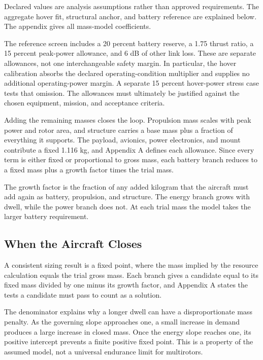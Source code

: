 \documentclass[twocolumn,letterpaper]{IEEEAerospaceCLS}
\begin{document}
Declared values are analysis assumptions rather than approved requirements. The aggregate hover fit, structural anchor, and battery reference are explained below. The appendix gives all mass-model coefficients.

The reference screen includes a 20 percent battery reserve, a 1.75 thrust ratio, a 15 percent peak-power allowance, and 6 dB of other link loss. These are separate allowances, not one interchangeable safety margin. In particular, the hover calibration absorbs the declared operating-condition multiplier and supplies no additional operating-power margin. A separate 15 percent hover-power stress case tests that omission. The allowances must ultimately be justified against the chosen equipment, mission, and acceptance criteria.

Adding the remaining masses closes the loop. Propulsion mass scales with peak power and rotor area, and structure carries a base mass plus a fraction of everything it supports. The payload, avionics, power electronics, and mount contribute a fixed 1.116 kg, and Appendix A defines each allowance. Since every term is either fixed or proportional to gross mass, each battery branch reduces to a fixed mass plus a growth factor times the trial mass.

The growth factor is the fraction of any added kilogram that the aircraft must add again as battery, propulsion, and structure. The energy branch grows with dwell, while the power branch does not. At each trial mass the model takes the larger battery requirement.

\subsection{When the Aircraft Closes}

A consistent sizing result is a fixed point, where the mass implied by the resource calculation equals the trial gross mass. Each branch gives a candidate equal to its fixed mass divided by one minus its growth factor, and Appendix A states the tests a candidate must pass to count as a solution.

The denominator explains why a longer dwell can have a disproportionate mass penalty. As the governing slope approaches one, a small increase in demand produces a large increase in closed mass. Once the energy slope reaches one, its positive intercept prevents a finite positive fixed point. This is a property of the assumed model, not a universal endurance limit for multirotors.
\end{document}
